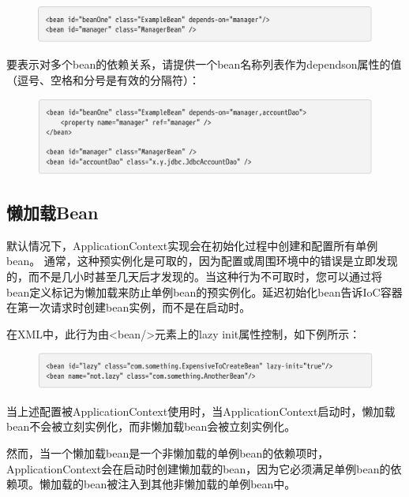 \begin{figure}[ht]
    \centering
    \includegraphics[width=1\linewidth]{./Figure/IMG_code_55.png}
\end{figure}

\newpage
要表示对多个bean的依赖关系，请提供一个bean名称列表作为dependson属性的值（逗号、空格和分号是有效的分隔符）：

\begin{figure}[ht]
    \centering
    \includegraphics[width=1\linewidth]{./Figure/56.png}
\end{figure}

\subsection{懒加载Bean}

默认情况下，ApplicationContext实现会在初始化过程中创建和配置所有单例bean。
通常，这种预实例化是可取的，因为配置或周围环境中的错误是立即发现的，而不是几小时甚至几天后才发现的。当这种行为不可取时，您可以通过将bean定义标记为懒加载来防止单例bean的预实例化。延迟初始化bean告诉IoC容器在第一次请求时创建bean实例，而不是在启动时。

在XML中，此行为由<bean/>元素上的lazy init属性控制，如下例所示：

\begin{figure}[ht]
    \centering
    \includegraphics[width=1\linewidth]{./Figure/57.png}
\end{figure}

当上述配置被ApplicationContext使用时，当ApplicationContext启动时，懒加载bean不会被立刻实例化，而非懒加载bean会被立刻实例化。

然而，当一个懒加载bean是一个非懒加载的单例bean的依赖项时，ApplicationContext会在启动时创建懒加载的bean，因为它必须满足单例bean的依赖项。懒加载的bean被注入到其他非懒加载的单例bean中。


